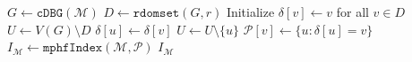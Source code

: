 \begin{algorithm}[!h]
	\begin{algorithmic}[1]
		\State $G\leftarrow \texttt{cDBG}(\mathcal{M})$\;
		\State $D\leftarrow \texttt{rdomset}(G, r)$\;
		\State Initialize $\delta[v] \leftarrow v$ for all $v \in D$\;
		\State $U \leftarrow V(G) \setminus D$
		\label{algstep:partition_start}
					\State $\delta[u] \leftarrow \delta[v]$\;
					\State $U \leftarrow U \setminus \{u\}$\;
				\EndFor
			\EndFor
		\EndWhile
 		\State $\mathcal{P}[v] \leftarrow \{u:\delta[u] = v\}$\;\label{algstep:partition_end}
		\State $I_{\mathcal{M}} \leftarrow \texttt{mphfIndex}(\mathcal{M}, \mathcal{P})$\;
		\State \Return $I_{\mathcal{M}}$
	\end{algorithmic}
	\caption{$\texttt{indexPieces}(\mathcal{M},r)$}\label{alg:index_pieces}
\end{algorithm}
